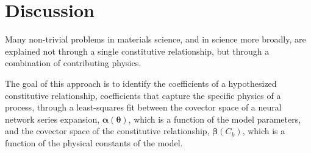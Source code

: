 \section{Discussion}\label{discussion}

Many non-trivial problems in materials science, and in science more broadly, are explained not through a single constitutive relationship, but through a combination of contributing physics.

%
%

The goal of this approach is to identify the coefficients of a hypothesized constitutive relationship, coefficients that capture the specific physics of a process, through a least-squares fit between the covector space of a neural network series expansion, $\boldsymbol{\alpha}(\boldsymbol{\theta})$, which is a function of the model parameters, and the covector space of the constitutive relationship, $\boldsymbol{\beta}(C_k)$, which is a function of the physical constants of the model.

